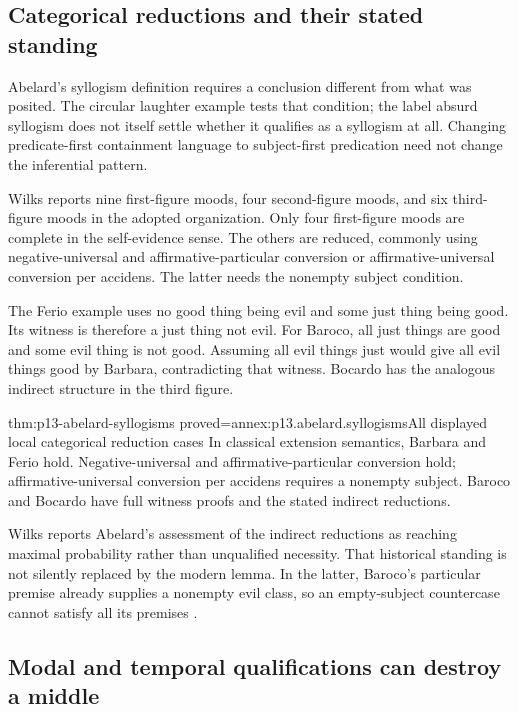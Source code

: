 \subsection{Categorical reductions and their stated standing}

Abelard's syllogism definition requires a conclusion different
from what was posited. The circular laughter example tests
that condition; the label absurd syllogism does not itself
settle whether it qualifies as a syllogism at all.
Changing predicate-first containment language to subject-first
predication need not change the inferential pattern.

Wilks reports nine first-figure moods, four second-figure moods,
and six third-figure moods in the adopted organization.
Only four first-figure moods are complete in the self-evidence
sense. The others are reduced, commonly using negative-universal
and affirmative-particular conversion or affirmative-universal
conversion per accidens.
The latter needs the nonempty subject condition.

The Ferio example uses no good thing being evil and some just
thing being good. Its witness is therefore a just thing not evil.
For Baroco, all just things are good and some evil thing is
not good. Assuming all evil things just would give all evil
things good by Barbara, contradicting that witness.
Bocardo has the analogous indirect structure in the third figure.

\begin{hblemma}{thm:p13-abelard-syllogisms}
 {proved=annex:p13.abelard.syllogisms}{All displayed local categorical reduction cases}
In classical extension semantics, Barbara and Ferio hold.
Negative-universal and affirmative-particular conversion hold;
affirmative-universal conversion per accidens requires a
nonempty subject. Baroco and Bocardo have full witness
proofs and the stated indirect reductions.
\end{hblemma}

Wilks reports Abelard's assessment of the indirect reductions
as reaching maximal probability rather than unqualified necessity.
That historical standing is not silently replaced by the
modern lemma. In the latter, Baroco's particular premise already
supplies a nonempty evil class, so an empty-subject countercase
cannot satisfy all its premises
\cite[pp.~116--119]{Wilks2007FordhamAbelard}.

\subsection{Modal and temporal qualifications can destroy a middle}

